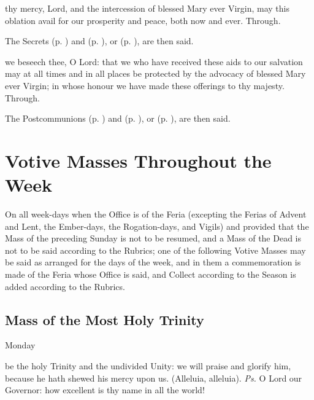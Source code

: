 
\secret
{} thy mercy, Lord, and the intercession of blessed Mary ever Virgin, may this oblation avail for our prosperity and peace, both now and ever. Through.
\begin{rubric}
    The Secrets  (p. \pageref{SPHolyGhost}) and  (p. \pageref{SPAgainst}), or  (p. \pageref{SPChiefBishop}), are then said.
\end{rubric}


\postcommunion
{} we beseech thee, O Lord: that we who have received these aids to our salvation may at all times and in all places be protected by the advocacy of blessed Mary ever Virgin; in whose honour we have made these offerings to thy majesty. Through.
\begin{rubric}
    The Postcommunions  (p. \pageref{SPHolyGhost}) and  (p. \pageref{SPAgainst}), or  (p. \pageref{SPChiefBishop}), are then said.
\end{rubric}

\clearpage

\section{Votive Masses Throughout the Week}

\begin{rubric}
	On all week-days when the Office is of the Feria (excepting the Ferias of Advent and Lent, the Ember-days, the Rogation-days, and Vigils) and provided that the Mass of the preceding Sunday is not to be resumed, and a Mass of the Dead is not to be said according to the Rubrics; one of the following Votive Masses may be said as arranged for the days of the week, and in them a commemoration is made of the Feria whose Office is said, and  Collect according to the Season is added according to the Rubrics.
\end{rubric}

\subsection{Mass of the Most Holy Trinity}
\begin{inhead}
	Monday
\end{inhead}
\introit
{} be the holy Trinity and the undivided Unity: we will praise and glorify him, because he hath shewed his mercy upon us. (Alleluia, alleluia). \textit{Ps.} O Lord our Governor: how excellent is thy name in all the world!

